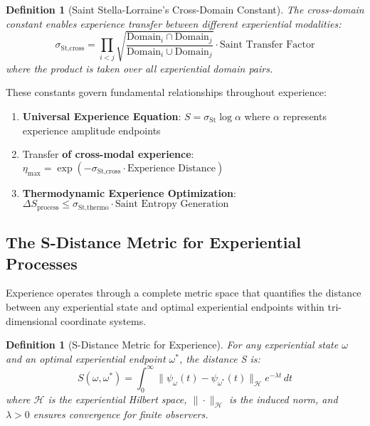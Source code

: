 \documentclass{article}
\newtheorem{definition}[theorem]{Definition}
\begin{document}
\begin{definition}[Saint Stella-Lorraine's Cross-Domain Constant]
The cross-domain constant enables experience transfer between different experiential modalities:
\begin{equation}
\sigma_{\text{St,cross}} = \prod_{i<j} \sqrt{\frac{\text{Domain}_i \cap \text{Domain}_j}{\text{Domain}_i \cup \text{Domain}_j}} \cdot \text{Saint Transfer Factor}
\end{equation}
where the product is taken over all experiential domain pairs.
\end{definition}

These constants govern fundamental relationships throughout experience:

\begin{enumerate}
\item \textbf{Universal Experience Equation}: $S = \sigma_{\text{St}} \log \alpha$ where $\alpha$ represents experience amplitude endpoints
\item Transfer \textbf{of cross-modal experience}: $\eta_{\text{max}} = \exp(-\sigma_{\text{St,cross}} \cdot \text{Experience Distance})$
\item \textbf{Thermodynamic Experience Optimization}: $\Delta S_{\text{process}} \leq \sigma_{\text{St,thermo}} \cdot \text{Saint Entropy Generation}$
\end{enumerate}

\subsection{The S-Distance Metric for Experiential Processes}

Experience operates through a complete metric space that quantifies the distance between any experiential state and optimal experiential endpoints within tri-dimensional coordinate systems.

\begin{definition}[S-Distance Metric for Experience]
For any experiential state $\omega$ and an optimal experiential endpoint $\omega^*$, the distance S is:
\begin{equation}
S(\omega, \omega^*) = \int_0^{\infty} \|\psi_\omega(t) - \psi_{\omega^*}(t)\|_{\mathcal{H}} e^{-\lambda t} \, dt
\end{equation}
where $\mathcal{H}$ is the experiential Hilbert space, $\|\cdot\|_{\mathcal{H}}$ is the induced norm, and $\lambda > 0$ ensures convergence for finite observers.
\end{definition}
\end{document}
